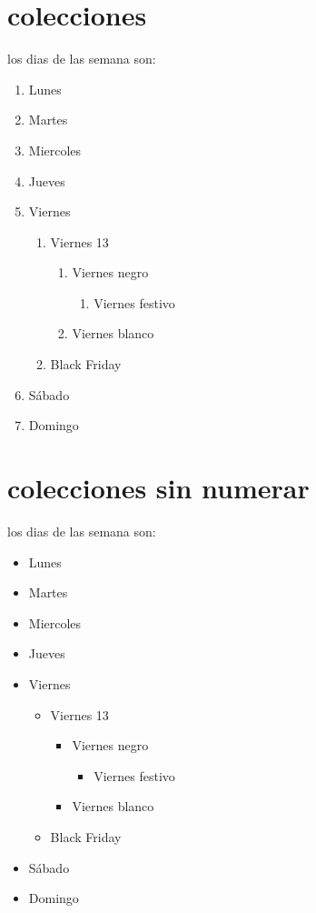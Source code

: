 \documentclass[10pt,a4paper]{article}
\begin{document}
\section{colecciones}
los dias de las semana son: 
	\begin{enumerate}
		\item Lunes
		\item Martes
		\item Miercoles
		\item Jueves 
		\item Viernes
			\begin{enumerate}
				\item Viernes 13
					\begin{enumerate}
						\item Viernes negro
							\begin{enumerate}
								\item Viernes festivo 
							\end{enumerate}
						\item Viernes blanco 
					\end{enumerate}
				\item Black Friday
			\end{enumerate}		 
		\item Sábado 
		\item Domingo
	\end{enumerate}
	\section{colecciones sin numerar}
		los dias de las semana son: 
	\begin{itemize}
		\item Lunes
		\item Martes
		\item Miercoles
		\item Jueves 
		\item Viernes
			\begin{itemize}
				\item Viernes 13
					\begin{itemize}
						\item Viernes negro
							\begin{itemize}
								\item Viernes festivo 
							\end{itemize}
						\item Viernes blanco 
					\end{itemize}
				\item Black Friday
			\end{itemize}		 
		\item Sábado 
		\item Domingo
	\end{itemize}
\end{document}
